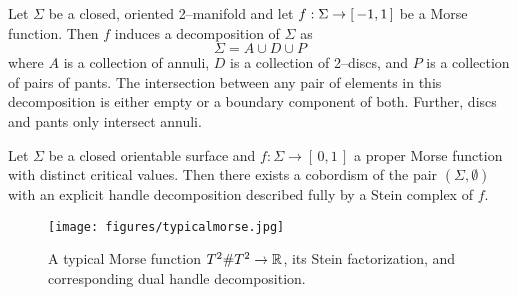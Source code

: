 \begin{lem}
	\label{lem:sigmadecomp}
	Let $\Sigma$ be a closed, oriented 2--manifold and let $f:\Sigma\to[\,-1,1\,]$ be a Morse function.
	Then $f$ induces a decomposition of $\Sigma$ as
	\[
		\Sigma=A\cup D\cup P
	\]
	where $A$ is a collection of annuli, $D$ is a collection of 2--discs, and $P$ is a collection of pairs of pants.
	The intersection between any pair of elements in this decomposition is either empty or a boundary component of both.
	Further, discs and pants only intersect annuli.	
\end{lem}



\begin{theorem}
	\label{thm:2bound3}
	Let $\Sigma$ be a closed orientable surface and $f:\Sigma\to[\,0,1\,]$ a proper Morse function with distinct critical values.
	Then there exists a cobordism of the pair $(\Sigma,\emptyset)$ with an explicit handle decomposition described fully by a Stein complex of $f$.
\end{theorem}

\begin{figure}
	\caption{A typical Morse function $T^2\# T^2\to\mathbb{R}$, its Stein factorization, and corresponding dual handle decomposition.}
	\centering
	\texttt{[image: figures/typicalmorse.jpg]}
	\label{fig:typicalmorse}
\end{figure}

